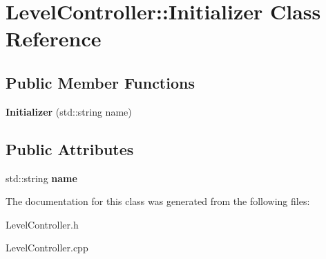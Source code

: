 \hypertarget{class_level_controller_1_1_initializer}{\section{Level\-Controller\-:\-:Initializer Class Reference}
\label{class_level_controller_1_1_initializer}
}
\subsection*{Public Member Functions}
\begin{DoxyCompactItemize}
\item 
\hypertarget{class_level_controller_1_1_initializer_a12f38f31c04a35ea21f977883eb6f4d5}{{\bfseries Initializer} (std\-::string name)}\label{class_level_controller_1_1_initializer_a12f38f31c04a35ea21f977883eb6f4d5}

\end{DoxyCompactItemize}
\subsection*{Public Attributes}
\begin{DoxyCompactItemize}
\item 
\hypertarget{class_level_controller_1_1_initializer_ac90a27c67674791807041b13124426c7}{std\-::string {\bfseries name}}\label{class_level_controller_1_1_initializer_ac90a27c67674791807041b13124426c7}

\end{DoxyCompactItemize}


The documentation for this class was generated from the following files\-:\begin{DoxyCompactItemize}
\item 
Level\-Controller.\-h\item 
Level\-Controller.\-cpp\end{DoxyCompactItemize}
